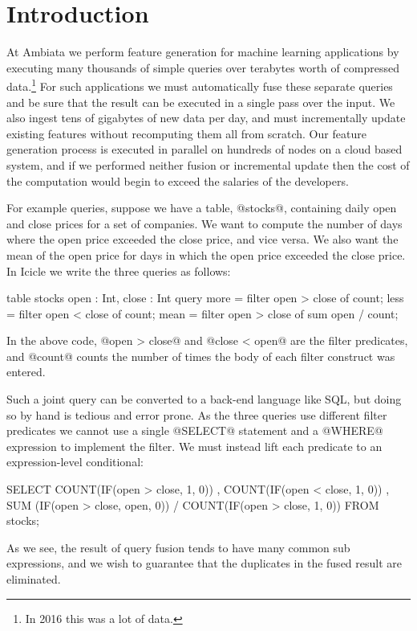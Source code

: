 \section{Introduction}
\label{s:Introduction}

At Ambiata we perform feature generation for machine learning applications by executing many thousands of simple queries over terabytes worth of compressed data.\footnote{In 2016 this was a lot of data.}
For such applications we must automatically fuse these separate queries and be sure that the result can be executed in a single pass over the input.
We also ingest tens of gigabytes of new data per day, and must incrementally update existing features without recomputing them all from scratch.
Our feature generation process is executed in parallel on hundreds of nodes on a cloud based system, and if we performed neither fusion or incremental update then the cost of the computation would begin to exceed the salaries of the developers.

For example queries, suppose we have a table, @stocks@, containing daily open and close prices for a set of companies. We want to compute the number of days where the open price exceeded the close price, and vice versa. We also want the mean of the open price for days in which the open price exceeded the close price. In Icicle we write the three queries as follows:

\begin{code}
table stocks { open : Int, close : Int }
query 
  more  = filter open > close of count;
  less  = filter open < close of count;
  mean  = filter open > close of sum open / count;
\end{code}
In the above code, @open > close@ and @close < open@ are the filter predicates, and @count@ counts the number of times the body of each filter construct was entered.

Such a joint query can be converted to a back-end language like SQL, but doing so by hand is tedious and error prone. As the three queries use different filter predicates we cannot use a single @SELECT@ statement and a @WHERE@ expression to implement the filter. We must instead lift each predicate to an expression-level conditional:
\begin{code}
  SELECT COUNT(IF(open > close, 1, 0))
       , COUNT(IF(open < close, 1, 0))
       , SUM  (IF(open > close, open, 0))
       / COUNT(IF(open > close, 1, 0))
  FROM stocks;
\end{code}
As we see, the result of query fusion tends to have many common sub expressions, and we wish to guarantee that the duplicates in the fused result are eliminated.

